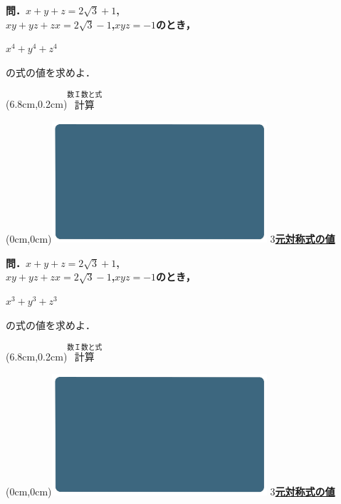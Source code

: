 \documentclass[10pt,
fleqn,
dvipdfmx,
uplatex
]{jsarticle}
\begin{document}
\normalsize
\bf\boldmath 問．$x+y+z=2\sqrt 3+1$,\;\\
\hfill $xy+yz+zx=2\sqrt 3-1$,\;$xyz=-1$のとき，

\HUGE 
\vspace{-0.2zw}
\hspace{0.5zw} $x^4+y^4+z^4$
\vspace{0.3zw}
    
\large
\hfill の式の値を求めよ．

\at(6.8cm,0.2cm){\small\color{bradorange}$\overset{\text{数Ｉ数と式}}{\text{計算}}$}


\newpage



\at(0cm,0cm){\includegraphics[width=8cm,bb=0 0 1920 1080]{./thumbnails/templates/smart_background/数I数と式.jpeg}}
{\color{orange}\bf\boldmath\huge\underline{$3$元対称式の値}}\vspace{0.3zw}

\normalsize
\bf\boldmath 問．$x+y+z=2\sqrt 3+1$,\;\\
\hfill $xy+yz+zx=2\sqrt 3-1$,\;$xyz=-1$のとき，

\HUGE 
\vspace{-0.2zw}
\hspace{0.5zw} $x^3+y^3+z^3$
\vspace{0.3zw}

\large
\hfill の式の値を求めよ．

\at(6.8cm,0.2cm){\small\color{bradorange}$\overset{\text{数Ｉ数と式}}{\text{計算}}$}


\newpage



\at(0cm,0cm){\includegraphics[width=8cm,bb=0 0 1920 1080]{./thumbnails/templates/smart_background/数I数と式.jpeg}}
{\color{orange}\bf\boldmath\huge\underline{$3$元対称式の値}}\vspace{0.3zw}
\end{document}
